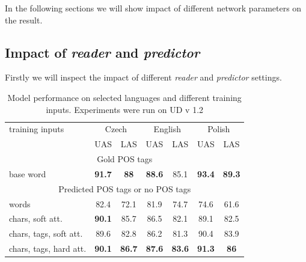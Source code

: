 In the following sections we will show impact of different network parameters
on the result.

\subsection{Impact of \emph{reader} and \emph{predictor}}
Firstly we will inspect the impact of different \emph{reader} and \emph{predictor}
settings.
\begin{table}[!htbp]
  \centering
  \label{tab:results}
  \begin{tabular}{l|cc|cc|cc|}
    training inputs & \multicolumn{2}{c|}{Czech} & \multicolumn{2}{c|}{English} & \multicolumn{2}{c|}{Polish} \\
    & UAS & LAS & UAS & LAS & UAS & LAS \\ 
    \multicolumn{7}{c}{Gold POS tags} \\  \hline
    base word & 
    \textbf{91.7} & \textbf{88} & 
    \textbf{88.6} & 85.1 & 
    \textbf{93.4} & \textbf{89.3} \\
    \multicolumn{7}{c}{Predicted POS tags or no POS tags} \\ \hline
    words & 
    82.4 & 72.1 &
    81.9 & 74.7 & 
    74.6 & 61.6  \\
    chars, soft att. & 
    \textbf{90.1} & 85.7 & %
    86.5 & 82.1 & %
    89.1 & 82.5 \\ %
    chars, tags, soft att. & 
    89.6 & 82.8 & %
    86.2 & 81.3 & %
    90.4 & 83.9 \\ %
    chars, tags, hard att. & 
    \textbf{90.1} & \textbf{86.7} & %
    \textbf{87.6} & \textbf{83.6} & %
    \textbf{91.3} & \textbf{86} \\ %
  \end{tabular}
  \caption{Model performance on selected languages and different training inputs. Experiments were run on UD v 1.2} 
\end{table}

